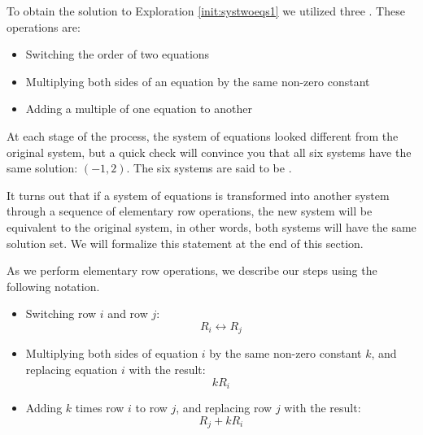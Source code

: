 \documentclass{ximera}
\begin{document}
To obtain the solution to Exploration \ref{init:systwoeqs1} we utilized three .  These operations are:
\begin{itemize}
\item Switching the order of two equations
\item Multiplying both sides of an equation by the same non-zero constant
\item Adding a multiple of one equation to another
\end{itemize}
At each stage of the process, the system of equations looked different from the original system, but a quick check will convince you that all six systems have the same solution: $(-1, 2)$.  The six systems are said to be .  


It turns out that if a system of equations is transformed into another system through a sequence of elementary row operations, the new system will be equivalent to the original system, in other words, both systems will have the same solution set.  We will formalize this statement at the end of this section.

\begin{notation}
As we perform elementary row operations, we describe our steps using the following notation.
\begin{itemize}
\item 
Switching row $i$ and row $j$: $$R_i\leftrightarrow R_j$$
\item Multiplying both sides of equation $i$ by the same non-zero constant $k$, and replacing equation $i$ with the result:
$$kR_i$$
\item 
Adding $k$ times row $i$ to row $j$, and replacing row $j$ with the result:
$$R_j+kR_i$$
\end{itemize}

\end{notation}
\end{document}
